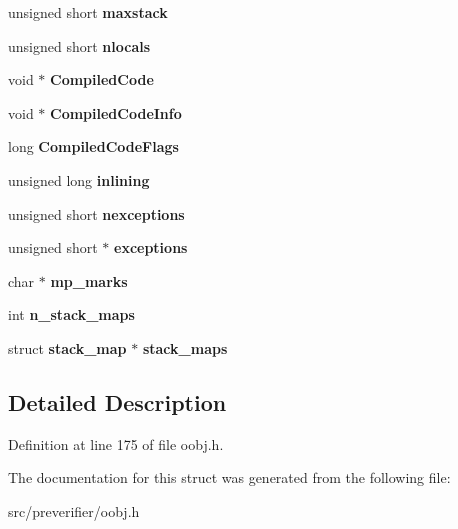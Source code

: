 \begin{DoxyCompactItemize}
\item 
unsigned short {\bfseries maxstack}\label{structmethodblock_a4564b455eb0c4050166333500359f69f}

\item 
unsigned short {\bfseries nlocals}\label{structmethodblock_a3ecf935bf3512f39d1c269e2d1ae208e}

\item 
void $\ast$ {\bfseries CompiledCode}\label{structmethodblock_ac9eeeb388eff5dc96608aa20da150305}

\item 
void $\ast$ {\bfseries CompiledCodeInfo}\label{structmethodblock_ab8a9478b1faf529a1db8df001d3e0bb8}

\item 
long {\bfseries CompiledCodeFlags}\label{structmethodblock_ac67ee1347e2ae487919b9187ba34764b}

\item 
unsigned long {\bfseries inlining}\label{structmethodblock_ab394aa3293f71389aeae691262547634}

\item 
unsigned short {\bfseries nexceptions}\label{structmethodblock_a1f4fa8e36fb2deff5b530027d2766124}

\item 
unsigned short $\ast$ {\bfseries exceptions}\label{structmethodblock_a99d6e6a1be8511605a95661a38d9b734}

\item 
char $\ast$ {\bfseries mp\_\-marks}\label{structmethodblock_a45d083b981f74842121471112129659d}

\item 
int {\bfseries n\_\-stack\_\-maps}\label{structmethodblock_a9d1a7fa6ceb42924d96678abb189e714}

\item 
struct {\bf stack\_\-map} $\ast$ {\bfseries stack\_\-maps}\label{structmethodblock_a27e6aa13a602f4c21ca16869049aa790}

\end{DoxyCompactItemize}


\subsection{Detailed Description}


Definition at line 175 of file oobj.h.



The documentation for this struct was generated from the following file:\begin{DoxyCompactItemize}
\item 
src/preverifier/oobj.h\end{DoxyCompactItemize}
